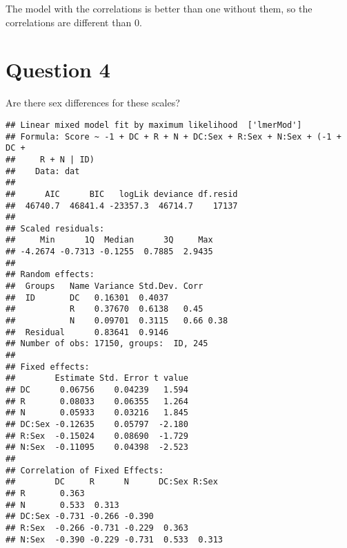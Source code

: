\documentclass[]{article}
\newenvironment{Shaded}{\begin{snugshade}}{\end{snugshade}}
\newcommand{\KeywordTok}[1]{\textcolor[rgb]{0.13,0.29,0.53}{\textbf{#1}}}
\newcommand{\DataTypeTok}[1]{\textcolor[rgb]{0.13,0.29,0.53}{#1}}
\newcommand{\DecValTok}[1]{\textcolor[rgb]{0.00,0.00,0.81}{#1}}
\newcommand{\StringTok}[1]{\textcolor[rgb]{0.31,0.60,0.02}{#1}}
\newcommand{\OperatorTok}[1]{\textcolor[rgb]{0.81,0.36,0.00}{\textbf{#1}}}
\newcommand{\NormalTok}[1]{#1}
\begin{document}
The model with the correlations is better than one without them, so the
correlations are different than 0.

\section{Question 4}\label{question-4}

Are there sex differences for these scales?

\begin{Shaded}
\end{Shaded}

\begin{verbatim}
## Linear mixed model fit by maximum likelihood  ['lmerMod']
## Formula: Score ~ -1 + DC + R + N + DC:Sex + R:Sex + N:Sex + (-1 + DC +  
##     R + N | ID)
##    Data: dat
## 
##      AIC      BIC   logLik deviance df.resid 
##  46740.7  46841.4 -23357.3  46714.7    17137 
## 
## Scaled residuals: 
##     Min      1Q  Median      3Q     Max 
## -4.2674 -0.7313 -0.1255  0.7885  2.9435 
## 
## Random effects:
##  Groups   Name Variance Std.Dev. Corr     
##  ID       DC   0.16301  0.4037            
##           R    0.37670  0.6138   0.45     
##           N    0.09701  0.3115   0.66 0.38
##  Residual      0.83641  0.9146            
## Number of obs: 17150, groups:  ID, 245
## 
## Fixed effects:
##        Estimate Std. Error t value
## DC      0.06756    0.04239   1.594
## R       0.08033    0.06355   1.264
## N       0.05933    0.03216   1.845
## DC:Sex -0.12635    0.05797  -2.180
## R:Sex  -0.15024    0.08690  -1.729
## N:Sex  -0.11095    0.04398  -2.523
## 
## Correlation of Fixed Effects:
##        DC     R      N      DC:Sex R:Sex 
## R       0.363                            
## N       0.533  0.313                     
## DC:Sex -0.731 -0.266 -0.390              
## R:Sex  -0.266 -0.731 -0.229  0.363       
## N:Sex  -0.390 -0.229 -0.731  0.533  0.313
\end{verbatim}
\end{document}
